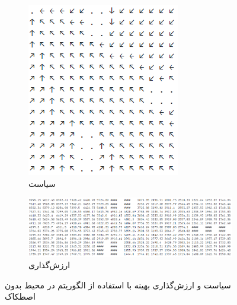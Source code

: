 \documentclass[12pt, a4paper]{article}
\begin{document}
\begin{figure}
    \begin{subfigure}{\linewidth}
        \centering
        \includegraphics{images/q4/e/nocost/policy.png}
        \caption{سیاست}
    \end{subfigure}
    \newline
    \begin{subfigure}{\linewidth}
        \centering
        \includegraphics[width=\linewidth]{images/q4/e/nocost/value.png}
        \caption{ارزش‌گذاری}
    \end{subfigure}
    \caption{سیاست و ارزش‌گذاری بهینه با استفاده از الگوریتم  در محیط بدون اصطکاک}
    \label{value_iter_nocost}
\end{figure}

\clearpage
\end{document}
